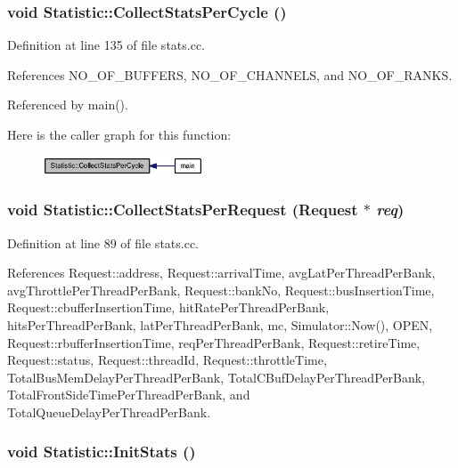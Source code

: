 \subsubsection[{CollectStatsPerCycle}]{\setlength{\rightskip}{0pt plus 5cm}void Statistic::CollectStatsPerCycle ()}\label{classStatistic_236ec4d09c07aeaf8311061cfe837a08}




Definition at line 135 of file stats.cc.

References NO\_\-OF\_\-BUFFERS, NO\_\-OF\_\-CHANNELS, and NO\_\-OF\_\-RANKS.

Referenced by main().

Here is the caller graph for this function:\nopagebreak
\begin{figure}[H]
\begin{center}
\leavevmode
\includegraphics[width=135pt]{classStatistic_236ec4d09c07aeaf8311061cfe837a08_icgraph}
\end{center}
\end{figure}
\subsubsection[{CollectStatsPerRequest}]{\setlength{\rightskip}{0pt plus 5cm}void Statistic::CollectStatsPerRequest ({\bf Request} $\ast$ {\em req})}\label{classStatistic_b9e517fce7d9ae39a851fd4eb8ec6d8e}




Definition at line 89 of file stats.cc.

References Request::address, Request::arrivalTime, avgLatPerThreadPerBank, avgThrottlePerThreadPerBank, Request::bankNo, Request::busInsertionTime, Request::cbufferInsertionTime, hitRatePerThreadPerBank, hitsPerThreadPerBank, latPerThreadPerBank, mc, Simulator::Now(), OPEN, Request::rbufferInsertionTime, reqPerThreadPerBank, Request::retireTime, Request::status, Request::threadId, Request::throttleTime, TotalBusMemDelayPerThreadPerBank, TotalCBufDelayPerThreadPerBank, TotalFrontSideTimePerThreadPerBank, and TotalQueueDelayPerThreadPerBank.
\subsubsection[{InitStats}]{\setlength{\rightskip}{0pt plus 5cm}void Statistic::InitStats ()}\label{classStatistic_fabb153ded71e9865b72ad0da907de0f}




